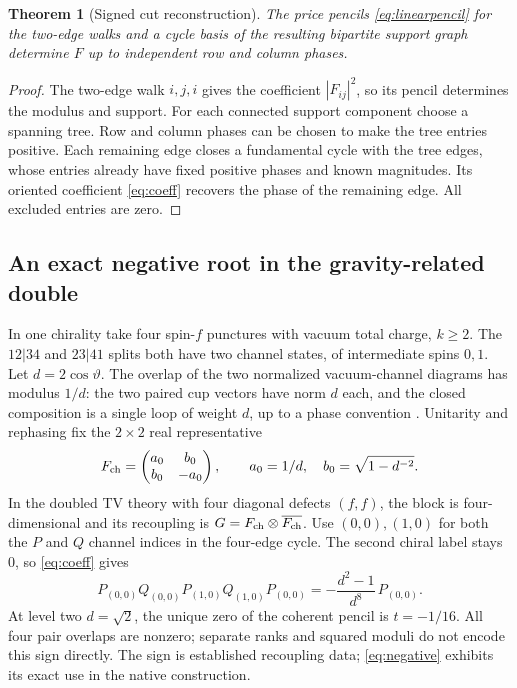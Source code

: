 \documentclass[11pt]{article}
\numberwithin{equation}{section}
\newtheorem{theorem}{Theorem}[section]
\theoremstyle{definition}
\theoremstyle{remark}
\begin{document}
\begin{theorem}[Signed cut reconstruction]\label{thm:signed}
The price pencils \eqref{eq:linearpencil} for the two-edge walks and a cycle basis of the resulting bipartite support graph determine \(F\) up to independent row and column phases.
\end{theorem}
\begin{proof}
The two-edge walk \(i,j,i\) gives the coefficient \(|F_{ij}|^2\), so its pencil determines the modulus and support. For each connected support component choose a spanning tree. Row and column phases can be chosen to make the tree entries positive. Each remaining edge closes a fundamental cycle with the tree edges, whose entries already have fixed positive phases and known magnitudes. Its oriented coefficient \eqref{eq:coeff} recovers the phase of the remaining edge. All excluded entries are zero.
\end{proof}

\subsection{An exact negative root in the gravity-related double}

In one chirality take four spin-\(f\) punctures with vacuum total charge, \(k\ge2\). The \(12|34\) and \(23|41\) splits both have two channel states, of intermediate spins \(0,1\). Let \(d=2\cos\vartheta\). The overlap of the two normalized vacuum-channel diagrams has modulus \(1/d\): the two paired cup vectors have norm \(d\) each, and the closed composition is a single loop of weight \(d\), up to a phase convention \cite{KauffmanLins}. Unitarity and rephasing fix the \(2\times2\) real representative
\begin{equation}\label{eq:had}
 F_{\rm ch}=
 \begin{pmatrix}a_0&b_0\\ b_0&-a_0\end{pmatrix},
 \qquad a_0=1/d,\quad b_0=\sqrt{1-d^{-2}} .
\end{equation}
In the doubled TV theory with four diagonal defects \((f,f)\), the block is four-dimensional and its recoupling is \(G=F_{\rm ch}\otimes\overline{F_{\rm ch}}\). Use \((0,0),(1,0)\) for both the \(P\) and \(Q\) channel indices in the four-edge cycle. The second chiral label stays \(0\), so \eqref{eq:coeff} gives
\begin{equation}\label{eq:negative}
  P_{(0,0)}Q_{(0,0)}P_{(1,0)}Q_{(1,0)}P_{(0,0)}
      =-\frac{d^2-1}{d^8}\,P_{(0,0)}.
\end{equation}
At level two \(d=\sqrt2\), the unique zero of the coherent pencil is \(t=-1/16\). All four pair overlaps are nonzero; separate ranks and squared moduli do not encode this sign directly. The sign is established recoupling data; \eqref{eq:negative} exhibits its exact use in the native construction.
\end{document}
